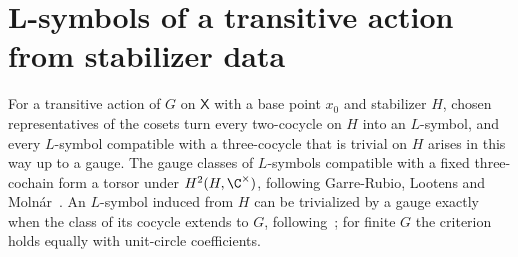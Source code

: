 \section{L-symbols of a transitive action from stabilizer data}
\label{sec:threecocycle_stabilizer}

For a transitive action of $G$ on $\mathsf X$ with a base point $x_0$ and
stabilizer $H$, chosen representatives of the cosets turn every two-cocycle
on $H$ into an $L$-symbol, and every $L$-symbol compatible with a
three-cocycle that is trivial on $H$ arises in this way up to a gauge. The
gauge classes of $L$-symbols compatible with a fixed three-cochain form a
torsor under $H^2(H,\C^\times)$, following Garre-Rubio, Lootens and
Moln\'ar~\cite{GarreRubio2023MPOSym}. An $L$-symbol induced from $H$ can be
trivialized by a gauge exactly when the class of its cocycle extends to $G$,
following~\cite{FrancoRubio2025MPUGauging}; for finite $G$ the criterion
holds equally with unit-circle coefficients.

